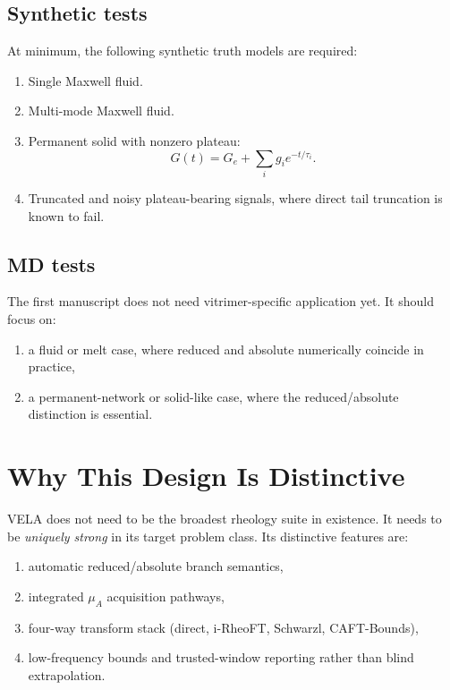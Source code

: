\documentclass[11pt]{article}
\begin{document}
\subsection{Synthetic tests}
At minimum, the following synthetic truth models are required:
\begin{enumerate}[leftmargin=2em]
  \item Single Maxwell fluid.
  \item Multi-mode Maxwell fluid.
  \item Permanent solid with nonzero plateau:
  \begin{equation}
  G(t)=G_e+\sum_i g_i e^{-t/\tau_i}.
  \end{equation}
  \item Truncated and noisy plateau-bearing signals, where direct tail truncation is known to fail.
\end{enumerate}

\subsection{MD tests}
The first manuscript does not need vitrimer-specific application yet. It should focus on:
\begin{enumerate}[leftmargin=2em]
  \item a fluid or melt case, where reduced and absolute numerically coincide in practice,
  \item a permanent-network or solid-like case, where the reduced/absolute distinction is essential.
\end{enumerate}

\section{Why This Design Is Distinctive}

VELA does not need to be the broadest rheology suite in existence. It needs to be \emph{uniquely strong} in its target problem class. Its distinctive features are:
\begin{enumerate}[leftmargin=2em]
  \item automatic reduced/absolute branch semantics,
  \item integrated $\mu_A$ acquisition pathways,
  \item four-way transform stack (direct, i-RheoFT, Schwarzl, CAFT-Bounds),
  \item low-frequency bounds and trusted-window reporting rather than blind extrapolation.
\end{enumerate}
\end{document}
